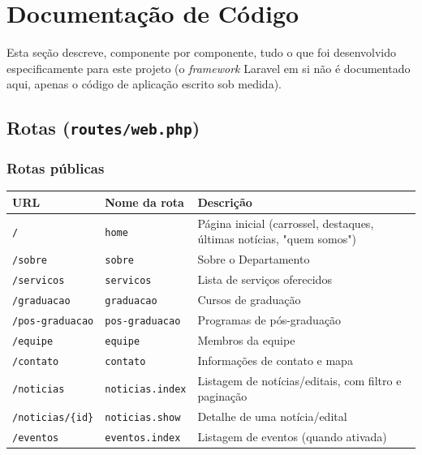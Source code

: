 \documentclass[11pt,a4paper]{article}
\begin{document}
\section{Documentação de Código}

Esta seção descreve, componente por componente, tudo o que foi desenvolvido especificamente
para este projeto (o \emph{framework} Laravel em si não é documentado aqui, apenas o código de
aplicação escrito sob medida).

\subsection{Rotas (\texttt{routes/web.php})}

\subsubsection{Rotas públicas}

\begin{longtable}{@{}p{4.5cm}p{4cm}p{6.5cm}@{}}
\toprule
\textbf{URL} & \textbf{Nome da rota} & \textbf{Descrição} \\
\midrule
\endhead
\texttt{/} & \texttt{home} & Página inicial (carrossel, destaques, últimas notícias, "quem somos") \\
\texttt{/sobre} & \texttt{sobre} & Sobre o Departamento \\
\texttt{/servicos} & \texttt{servicos} & Lista de serviços oferecidos \\
\texttt{/graduacao} & \texttt{graduacao} & Cursos de graduação \\
\texttt{/pos-graduacao} & \texttt{pos-graduacao} & Programas de pós-graduação \\
\texttt{/equipe} & \texttt{equipe} & Membros da equipe \\
\texttt{/contato} & \texttt{contato} & Informações de contato e mapa \\
\texttt{/noticias} & \texttt{noticias.index} & Listagem de notícias/editais, com filtro e paginação \\
\texttt{/noticias/\{id\}} & \texttt{noticias.show} & Detalhe de uma notícia/edital \\
\texttt{/eventos} & \texttt{eventos.index} & Listagem de eventos (quando ativada) \\
\bottomrule
\end{longtable}
\end{document}
